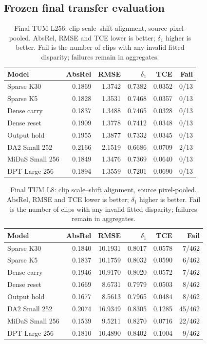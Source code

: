 \subsection{Frozen final transfer evaluation}
\begin{table}[H]
\caption{Final TUM L256: clip scale--shift alignment, source pixel-pooled. AbsRel, RMSE and TCE lower is better; $\delta_1$ higher is better. Fail is the number of clips with any invalid fitted disparity; failures remain in aggregates.}\label{tab:final256}
\centering\small
\begin{tabular}{lrrrrr}\toprule
Model & AbsRel & RMSE & $\delta_1$ & TCE & Fail \\
\midrule
Sparse K30 & 0.1869 & 1.3742 & 0.7382 & 0.0352 & 0/13 \\
Sparse K5 & 0.1828 & 1.3531 & 0.7468 & 0.0357 & 0/13 \\
Dense carry & 0.1837 & 1.3488 & 0.7465 & 0.0328 & 0/13 \\
Dense reset & 0.1909 & 1.3778 & 0.7412 & 0.0348 & 0/13 \\
Output hold & 0.1955 & 1.3877 & 0.7332 & 0.0345 & 0/13 \\
DA2 Small 252 & 0.2166 & 2.1519 & 0.6686 & 0.0709 & 2/13 \\
MiDaS Small 256 & 0.1849 & 1.3476 & 0.7369 & 0.0640 & 0/13 \\
DPT-Large 256 & 0.1894 & 1.3559 & 0.7201 & 0.0690 & 0/13 \\
\bottomrule\end{tabular}
\end{table}
\begin{table}[H]
\caption{Final TUM L8: clip scale--shift alignment, source pixel-pooled. AbsRel, RMSE and TCE lower is better; $\delta_1$ higher is better. Fail is the number of clips with any invalid fitted disparity; failures remain in aggregates.}\label{tab:final8}
\centering\small
\begin{tabular}{lrrrrr}\toprule
Model & AbsRel & RMSE & $\delta_1$ & TCE & Fail \\
\midrule
Sparse K30 & 0.1840 & 10.1931 & 0.8017 & 0.0578 & 7/462 \\
Sparse K5 & 0.1837 & 10.1759 & 0.8032 & 0.0590 & 6/462 \\
Dense carry & 0.1946 & 10.9170 & 0.8020 & 0.0572 & 7/462 \\
Dense reset & 0.1669 & 8.6731 & 0.7979 & 0.0503 & 8/462 \\
Output hold & 0.1677 & 8.5613 & 0.7965 & 0.0484 & 8/462 \\
DA2 Small 252 & 0.2074 & 16.9349 & 0.8305 & 0.1285 & 45/462 \\
MiDaS Small 256 & 0.1539 & 9.5211 & 0.8270 & 0.0716 & 22/462 \\
DPT-Large 256 & 0.1810 & 10.4890 & 0.8402 & 0.1004 & 9/462 \\
\bottomrule\end{tabular}
\end{table}
